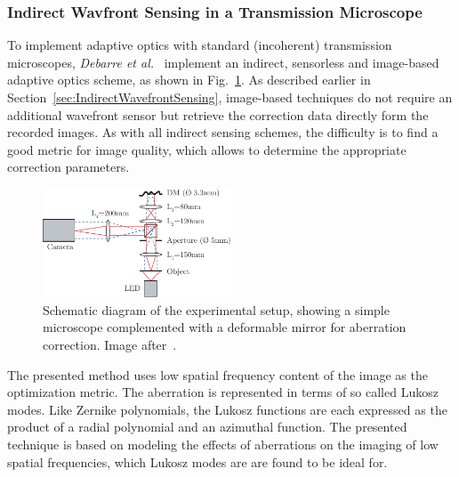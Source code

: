 \subsubsection{Indirect Wavfront Sensing in a Transmission Microscope}
\label{sec:TransmissionMicroscope}
To implement adaptive optics with standard (incoherent) transmission microscopes, \emph{Debarre et al.}~\cite{wide_AOM_loew_freq} implement an indirect, sensorless and image-based adaptive optics scheme, as shown in Fig.~\ref{fig:widefield_simple_microscope}. As described earlier in Section~\ref{sec:IndirectWavefrontSensing}, image-based techniques do not require an additional wavefront sensor but retrieve the correction data directly form the recorded images. As with all indirect sensing schemes, the difficulty is to find a good metric for image quality, which allows to determine the appropriate correction parameters.

\begin{figure}[htb]
	\centering
		\includegraphics[width=0.50\textwidth]{images/widefield_simple_microscope.pdf}
	\caption{Schematic diagram of the experimental setup, showing a simple microscope complemented with a deformable mirror for aberration correction. Image after~\cite{wide_AOM_loew_freq}.}
	\label{fig:widefield_simple_microscope}
\end{figure}

The presented method uses low spatial frequency content of the image as the optimization metric. The aberration is represented in terms of so called Lukosz modes. Like Zernike polynomials, the Lukosz functions are each expressed as the product of a radial polynomial and an azimuthal function. The presented technique is based on modeling the effects of aberrations on the imaging of low spatial frequencies, which Lukosz modes are are found to be ideal for.

